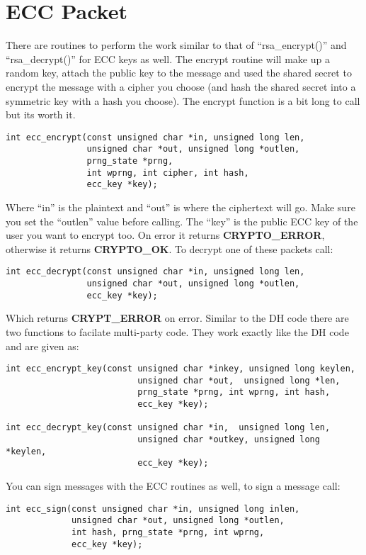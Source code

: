 \documentclass{book}
\begin{document}
\section{ECC Packet}
There are routines to perform the work similar to that of ``rsa\_encrypt()'' and ``rsa\_decrypt()'' for ECC keys as well.
The encrypt routine will make up a random key, attach the public key to the message and used the shared secret to encrypt
the message with a cipher you choose (and hash the shared secret into a symmetric key with a hash you choose).  The encrypt
function is a bit long to call but its worth it.
\begin{verbatim}
int ecc_encrypt(const unsigned char *in, unsigned long len, 
                unsigned char *out, unsigned long *outlen,
                prng_state *prng, 
                int wprng, int cipher, int hash, 
                ecc_key *key);
\end{verbatim}
Where ``in'' is the plaintext and ``out'' is where the ciphertext will go.  Make sure you set the ``outlen'' value before
calling.  The ``key'' is the public ECC key of the user you want to encrypt too.  On error it returns {\bf CRYPTO\_ERROR}, otherwise
it returns {\bf CRYPTO\_OK}.  To decrypt one of these packets call:
\begin{verbatim}
int ecc_decrypt(const unsigned char *in, unsigned long len, 
                unsigned char *out, unsigned long *outlen, 
                ecc_key *key);
\end{verbatim}
Which returns {\bf CRYPT\_ERROR} on error.  Similar to the DH code there are two functions to facilate multi-party code.
They work exactly like the DH code and are given as:
\begin{verbatim}
int ecc_encrypt_key(const unsigned char *inkey, unsigned long keylen,
                          unsigned char *out,  unsigned long *len, 
                          prng_state *prng, int wprng, int hash, 
                          ecc_key *key);

int ecc_decrypt_key(const unsigned char *in,  unsigned long len, 
                          unsigned char *outkey, unsigned long *keylen, 
                          ecc_key *key);
\end{verbatim}
You can sign messages with the ECC routines as well, to sign a message call:
\begin{verbatim}
int ecc_sign(const unsigned char *in, unsigned long inlen, 
             unsigned char *out, unsigned long *outlen, 
             int hash, prng_state *prng, int wprng, 
             ecc_key *key);
\end{verbatim}
\end{document}
